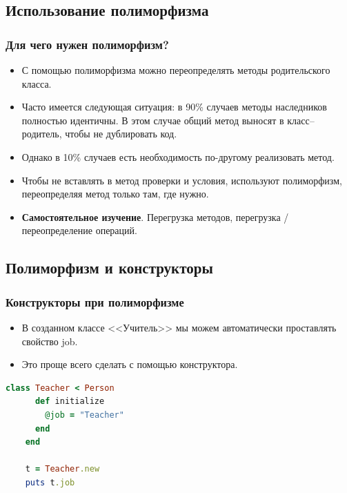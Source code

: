 \documentclass[compress,red]{beamer}
\begin{document}
\subsection{Использование полиморфизма}
\begin{frame}[fragile]
  \frametitle{Для чего нужен полиморфизм?}
  \begin{itemize}
    \item С помощью полиморфизма можно переопределять методы родительского класса.
    \item Часто имеется следующая ситуация: в 90\% случаев методы наследников полностью идентичны. В этом случае общий метод выносят в класс--родитель, чтобы не дублировать код.
    \item Однако в 10\% случаев есть необходимость по-другому реализовать метод.
    \item Чтобы не вставлять в метод проверки и условия, используют полиморфизм, переопределяя метод только там, где нужно.
    \item \textbf{Самостоятельное изучение}. Перегрузка методов, перегрузка / переопределение операций.
  \end{itemize}
\end{frame}

\subsection{Полиморфизм и конструкторы}
\begin{frame}[fragile]
  \frametitle{Конструкторы при полиморфизме}
  \begin{itemize}
    \item В созданном классе <<Учитель>> мы можем автоматически проставлять свойство job. 
    \item Это проще всего сделать с помощью конструктора.
  \end{itemize}
  \scriptsize{
  \begin{lstlisting}[language=ruby,basicstyle=\footnotesize,label=ruby8,caption=Конструктор в полиморфизме]
    class Teacher < Person
      def initialize
        @job = "Teacher"
      end
    end
    
    t = Teacher.new
    puts t.job
  \end{lstlisting}
  }
  
\end{frame}
\end{document}
